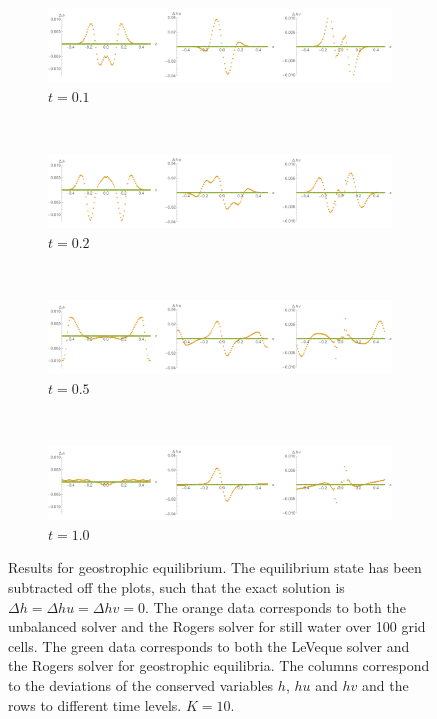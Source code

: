 \begin{figure}
  \centering
  \begin{subfigure}{\textwidth}
    \includegraphics[width=\textwidth]{diagrams/results-geo-1}
    \caption{$t = 0.1$}
    \label{fig:results-geo-1}
  \end{subfigure} \\
  \begin{subfigure}{\textwidth}
    \includegraphics[width=\textwidth]{diagrams/results-geo-2}
    \caption{$t = 0.2$}
    \label{fig:results-geo-2}
  \end{subfigure} \\
  \begin{subfigure}{\textwidth}
    \includegraphics[width=\textwidth]{diagrams/results-geo-5}
    \caption{$t = 0.5$}
    \label{fig:results-geo-5}
  \end{subfigure} \\
  \begin{subfigure}{\textwidth}
    \includegraphics[width=\textwidth]{diagrams/results-geo-10}
    \caption{$t = 1.0$}
    \label{fig:results-geo-10}
  \end{subfigure}
  \caption{Results for geostrophic equilibrium. The equilibrium state has been subtracted off the plots, such that the exact solution is $\Delta h = \Delta hu = \Delta hv = 0$. The orange data corresponds to both the unbalanced solver and the Rogers solver for still water over 100 grid cells. The green data corresponds to both the LeVeque solver and the Rogers solver for geostrophic equilibria. The columns correspond to the deviations of the conserved variables $h$, $hu$ and $hv$ and the rows to different time levels. $K = 10$.}
  \label{fig:results-geo}
\end{figure}

